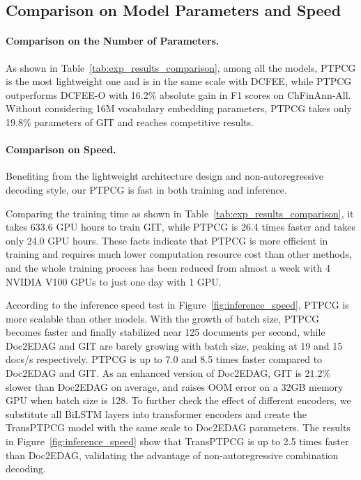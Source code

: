 \subsection{Comparison on Model Parameters and Speed}
\paragraph{Comparison on the Number of Parameters.}
As shown in Table~\ref{tab:exp_results_comparison}, among all the models, PTPCG is the most lightweight one and is in the same scale with DCFEE,
while PTPCG outperforms DCFEE-O with 16.2\% absolute gain in F1 scores on ChFinAnn-All.
Without considering 16M vocabulary embedding parameters, PTPCG takes only 19.8\% parameters of GIT and reaches competitive results.

\paragraph{Comparison on Speed.}
Benefiting from the lightweight architecture design and non-autoregressive decoding style, our PTPCG is fast in both training and inference.

Comparing the training time as shown in Table~\ref{tab:exp_results_comparison}, it takes 633.6 GPU hours to train GIT, while PTPCG is 26.4 times faster and takes only 24.0 GPU hours.
These facts indicate that PTPCG is more efficient in training and requires much lower computation resource cost than other methods, and the whole training process has been reduced from almost a week with 4 NVIDIA V100 GPUs to just one day with 1 GPU.

According to the inference speed test in Figure~\ref{fig:inference_speed}, PTPCG is more scalable than other models.
With the growth of batch size, PTPCG becomes faster and finally stabilized near 125 documents per second, while Doc2EDAG and GIT are barely growing with batch size, peaking at 19 and 15 docs/s respectively.
PTPCG is up to 7.0 and 8.5 times faster compared to Doc2EDAG and GIT.
As an enhanced version of Doc2EDAG, GIT is 21.2\% slower than Doc2EDAG on average, and raises OOM error on a 32GB memory GPU when batch size is 128.
To further check the effect of different encoders, we substitute all BiLSTM layers into transformer encoders and create the TransPTPCG model with the same scale to Doc2EDAG parameters.
The results in Figure~\ref{fig:inference_speed} show that TransPTPCG is up to 2.5 times faster than Doc2EDAG, validating the advantage of non-autoregressive combination decoding.

